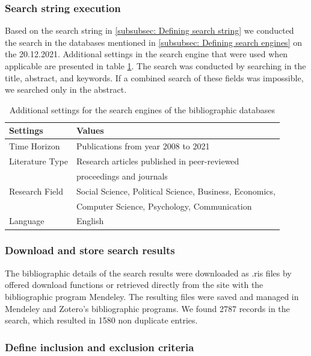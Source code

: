 \subsubsection{Search string execution}

Based on the search string in \ref{subsubsec: Defining search string} we conducted the search in the databases mentioned in \ref{subsubsec: Defining search engines} on the 20.12.2021. Additional settings in the search engine that were used when applicable are presented in table \ref{tab: search settings}. The search was conducted by searching in the title, abstract, and keywords. If a combined search of these fields was impossible, we searched only in the abstract.

\begin{table}
	\centering
	\begin{tabular}{ll}
		\toprule
		Settings & Values \\
		\midrule
		Time Horizon & Publications from year 2008 to 2021 \\ 
		Literature Type & Research articles published in peer-reviewed \\
		& proceedings and journals \\
		Research Field & Social Science, Political Science, Business, Economics, \\
		& Computer Science, Psychology, Communication \\
		Language & English \\
		\bottomrule 
	\end{tabular}
	\label{tab: search settings}
	\caption{Additional settings for the search engines of the bibliographic databases}
\end{table} 

\subsubsection{Download and store search results}

The bibliographic details of the search results were downloaded as .ris files by offered download functions or retrieved directly from the site with the bibliographic program Mendeley. The resulting files were saved and managed in Mendeley and Zotero's bibliographic programs. We found 2787 records in the search, which resulted in 1580 non duplicate entries.

\subsubsection{Define inclusion and exclusion criteria}
\label{subsec: Inclusion and Exclusion Criteria}

